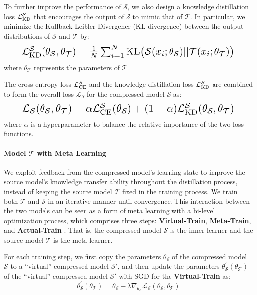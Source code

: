 \documentclass[11pt]{article}
\begin{document}
To further improve the performance of $\mathcal{S}$, we also design a knowledge distillation loss  $\mathcal{L}^{\mathcal{S}}_{\rm KD}$ that encourages the output of $\mathcal{S}$ to mimic that of $\mathcal{T}$. In particular, we minimize the Kullback-Leibler Divergence (KL-divergence) between the output distributions of $\mathcal{S}$ and $\mathcal{T}$ by:
\begin{equation}
\resizebox{0.89 \hsize}{!}{$\mathcal{L}^{\mathcal{S}}_{\rm KD}(\theta_{\mathcal{S}},\theta_{\mathcal{T}})= \frac{1}{N}\sum_{i=1}^{N}{\rm KL}\big(\mathcal{S}(x_i; \theta_{\mathcal{S}})||\mathcal{T}(x_i; \theta_{\mathcal{T}})\big) $}
\end{equation}
where $\theta_{\mathcal{T}}$ represents the parameters of  $\mathcal{T}$.

The cross-entropy loss $\mathcal{L}^{\mathcal{S}}_{\rm CE}$ and the knowledge distillation loss $\mathcal{L}^{\mathcal{S}}_{\rm KD}$ are combined to form the overall loss $\mathcal{L}_{\mathcal{S}}$ for the compressed model $\mathcal{S}$ as:
\begin{equation}
\resizebox{0.89 \hsize}{!}{$\mathcal{L}_{\mathcal{S}}(\theta_{\mathcal{S}},\theta_{\mathcal{T}})= \alpha \mathcal{L}^{\mathcal{S}}_{\rm CE}(\theta_{\mathcal{S}}) + (1-\alpha) \mathcal{L}^{\mathcal{S}}_{\rm KD}(\theta_{\mathcal{S}},\theta_{\mathcal{T}}) $}
\end{equation}
where $\alpha$ is a hyperparameter to balance the relative importance of the two loss functions. 




\paragraph{Model $\mathcal{T}$ with Meta Learning}
We exploit feedback from the compressed model's learning
state to improve the source model's knowledge transfer ability throughout the distillation process, instead of keeping the source model $\mathcal{T}$ fixed in the training process. 
We train both $\mathcal{T}$ and $\mathcal{S}$ in an iterative manner until convergence. This interaction between the two models can be seen as a form of meta learning with a bi-level optimization process, which comprises three steps: \textbf{Virtual-Train}, \textbf{Meta-Train}, and \textbf{Actual-Train} \cite{xu2021faster}.
That is, the compressed model $\mathcal{S}$ is the inner-learner and the source model $\mathcal{T}$ is the meta-learner. 

For each training step,
we first copy the parameters $\theta_{\mathcal{S}}$ of the compressed model $\mathcal{S}$ to a ``virtual'' compressed model $\mathcal{S}'$, and then update the parameters $\theta_{\mathcal{S}}^{'}(\theta_{\mathcal{T}})$ of the ``virtual'' compressed model $\mathcal{S}'$ with SGD \cite{bottou2012stochastic} for the \textbf{Virtual-Train} as:
\begin{equation}
\label{equation:S-update-2}
  \theta_{\mathcal{S}}^{'}(\theta_{\mathcal{T}}) = \theta_{\mathcal{S}} - \lambda \nabla_{\theta_{\mathcal{S}}} \mathcal{L}_{\mathcal{S}}(\theta_{\mathcal{S}},\theta_{\mathcal{T}})
\end{equation}
\end{document}
